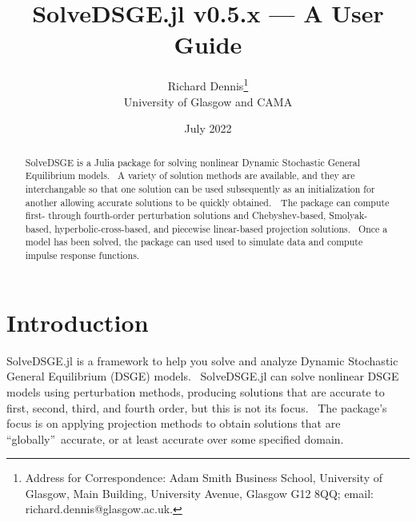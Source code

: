 \documentclass[notitlepage,11pt]{article}
\begin{document}
\author{Richard Dennis\thanks{%
Address for Correspondence: Adam Smith Business School, University of
Glasgow, Main Building, University Avenue, Glasgow G12 8QQ; email:
richard.dennis@glasgow.ac.uk.} \\
University of Glasgow and CAMA}
\title{SolveDSGE.jl v0.5.x --- A User Guide}
\date{July 2022}
\maketitle

\begin{abstract}
SolveDSGE is a Julia package for solving nonlinear Dynamic Stochastic
General Equilibrium models. \ A variety of solution methods are available,
and they are interchangable so that one solution can be used subsequently as
an initialization for another allowing accurate solutions to be quickly
obtained.\noindent\ \ The package can compute first- through fourth-order
perturbation solutions and Chebyshev-based, Smolyak-based,
hyperbolic-cross-based, and piecewise linear-based projection solutions. \
Once a model has been solved, the package can used used to simulate data and
compute impulse response functions.

\vspace{0.12in}
\end{abstract}

\thispagestyle{empty}\newpage \setlength{\baselineskip}{18.95pt}%
\setcounter{page}{1}

\section{Introduction}

SolveDSGE.jl is a framework to help you solve and analyze Dynamic Stochastic
General Equilibrium (DSGE) models. \ SolveDSGE.jl can solve nonlinear DSGE
models using perturbation methods, producing solutions that are accurate to
first, second, third, and fourth order, but this is not its focus. \ The
package's focus is on applying projection methods to obtain solutions that
are \textquotedblleft globally\textquotedblright\ accurate, or at least
accurate over some specified domain.
\end{document}

